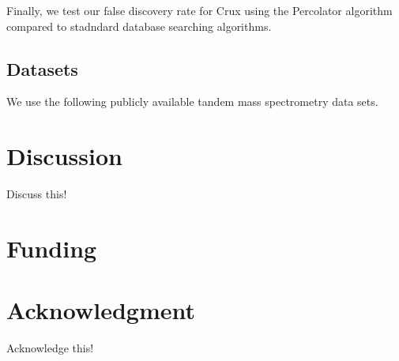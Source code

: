\documentclass{bioinfo}
\begin{document}
Finally, we test our false discovery rate for Crux using the
Percolator algorithm compared to stadndard database searching
algorithms.

\subsection*{Datasets}
We use the following publicly available tandem mass spectrometry data
sets.

\section{Discussion}
Discuss this!

\section*{Funding}

\section*{Acknowledgment}

Acknowledge this!





 
\end{document}
